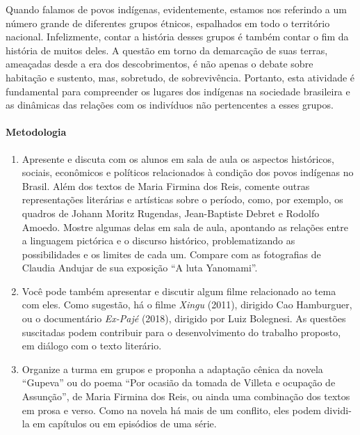 \documentclass[12pt]{extarticle}
\begin{document}
Quando falamos de povos indígenas, evidentemente, estamos nos referindo
a um número grande de diferentes grupos étnicos, espalhados em todo o
território nacional. Infelizmente, contar a história desses grupos é
também contar o fim da história de muitos deles. A questão em torno da
demarcação de suas terras, ameaçadas desde a era dos descobrimentos, é
não apenas o debate sobre habitação e sustento, mas, sobretudo, de
sobrevivência. Portanto, esta atividade é fundamental para compreender
os lugares dos indígenas na sociedade brasileira e as dinâmicas das
relações com os indivíduos não pertencentes a esses grupos.

\paragraph{Metodologia} 
\begin{enumerate}
\item
Apresente e discuta com os alunos em sala de
aula os aspectos históricos, sociais, econômicos e políticos
relacionados à condição dos povos indígenas no Brasil. Além dos textos
de Maria Firmina dos Reis, comente outras representações literárias e
artísticas sobre o período, como, por exemplo, os quadros de Johann
Moritz Rugendas, Jean-Baptiste Debret e Rodolfo Amoedo. Mostre algumas
delas em sala de aula, apontando as relações entre a linguagem pictórica
e o discurso histórico, problematizando as possibilidades e os limites
de cada um. Compare com as fotografias de Claudia Andujar de sua
exposição ``A luta Yanomami''.





\item
Você pode também apresentar e discutir algum filme relacionado ao
tema com eles. Como sugestão, há o filme \emph{Xingu} (2011), dirigido
Cao Hamburguer, ou o documentário \emph{Ex-Pajé} (2018), dirigido por
Luiz Bolegnesi. As questões suscitadas podem contribuir para o
desenvolvimento do trabalho proposto, em diálogo com o texto literário.

\item
Organize a turma em grupos e proponha a adaptação cênica da novela
``Gupeva'' ou do poema ``Por ocasião da tomada de Villeta e ocupação de
Assunção'', de Maria Firmina dos Reis, ou ainda uma combinação dos
textos em prosa e verso. Como na novela há mais de um conflito, eles
podem dividi-la em capítulos ou em episódios de uma série.


\end{enumerate}
\end{document}
